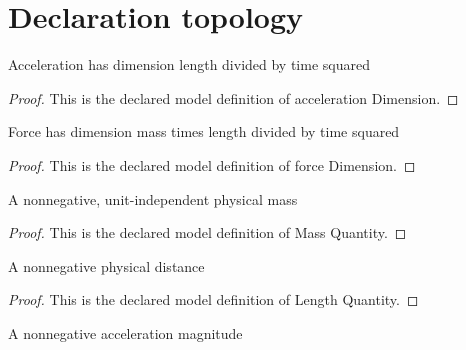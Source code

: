 \section{Declaration topology}
\begin{definition}
  \label{def:physics:phyx-mini-0808:phyxminiproblems-problemphyxmini0808-accelerationdimension}
  Acceleration has dimension length divided by time squared
\end{definition}
\begin{proof}
  This is the declared model definition of acceleration Dimension.
\end{proof}
\begin{definition}
  \label{def:physics:phyx-mini-0808:phyxminiproblems-problemphyxmini0808-forcedimension}
  Force has dimension mass times length divided by time squared
\end{definition}
\begin{proof}
  This is the declared model definition of force Dimension.
\end{proof}
\begin{definition}
  \label{def:physics:phyx-mini-0808:phyxminiproblems-problemphyxmini0808-massquantity}
  A nonnegative, unit-independent physical mass
\end{definition}
\begin{proof}
  This is the declared model definition of Mass Quantity.
\end{proof}
\begin{definition}
  \label{def:physics:phyx-mini-0808:phyxminiproblems-problemphyxmini0808-lengthquantity}
  A nonnegative physical distance
\end{definition}
\begin{proof}
  This is the declared model definition of Length Quantity.
\end{proof}
\begin{definition}
  \label{def:physics:phyx-mini-0808:phyxminiproblems-problemphyxmini0808-accelerationquantity}
  A nonnegative acceleration magnitude
\end{definition}
